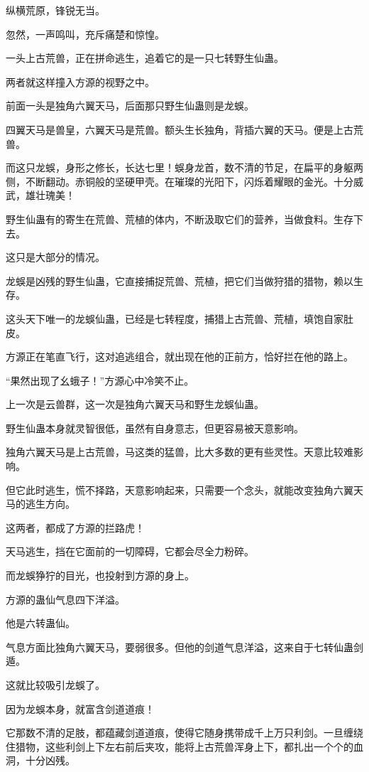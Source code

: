 \begin{this_body}
纵横荒原，锋锐无当。

忽然，一声鸣叫，充斥痛楚和惊惶。

一头上古荒兽，正在拼命逃生，追着它的是一只七转野生仙蛊。

两者就这样撞入方源的视野之中。

前面一头是独角六翼天马，后面那只野生仙蛊则是龙蜈。

四翼天马是兽皇，六翼天马是荒兽。额头生长独角，背插六翼的天马。便是上古荒兽。

而这只龙蜈，身形之修长，长达七里！蜈身龙首，数不清的节足，在扁平的身躯两侧，不断翻动。赤铜般的坚硬甲壳。在璀璨的光阳下，闪烁着耀眼的金光。十分威武，雄壮瑰美！

野生仙蛊有的寄生在荒兽、荒植的体内，不断汲取它们的营养，当做食料。生存下去。

这只是大部分的情况。

龙蜈是凶残的野生仙蛊，它直接捕捉荒兽、荒植，把它们当做狩猎的猎物，赖以生存。

这头天下唯一的龙蜈仙蛊，已经是七转程度，捕猎上古荒兽、荒植，填饱自家肚皮。

方源正在笔直飞行，这对追逃组合，就出现在他的正前方，恰好拦在他的路上。

“果然出现了幺蛾子！”方源心中冷笑不止。

上一次是云兽群，这一次是独角六翼天马和野生龙蜈仙蛊。

野生仙蛊本身就灵智很低，虽然有自身意志，但更容易被天意影响。

独角六翼天马是上古荒兽，马这类的猛兽，比大多数的更有些灵性。天意比较难影响。

但它此时逃生，慌不择路，天意影响起来，只需要一个念头，就能改变独角六翼天马的逃生方向。

这两者，都成了方源的拦路虎！

天马逃生，挡在它面前的一切障碍，它都会尽全力粉碎。

而龙蜈狰狞的目光，也投射到方源的身上。

方源的蛊仙气息四下洋溢。

他是六转蛊仙。

气息方面比独角六翼天马，要弱很多。但他的剑道气息洋溢，这来自于七转仙蛊剑遁。

这就比较吸引龙蜈了。

因为龙蜈本身，就富含剑道道痕！

它那数不清的足肢，都蕴藏剑道道痕，使得它随身携带成千上万只利剑。一旦缠绕住猎物，这些利剑上下左右前后夹攻，能将上古荒兽浑身上下，都扎出一个个的血洞，十分凶残。


\end{this_body}
